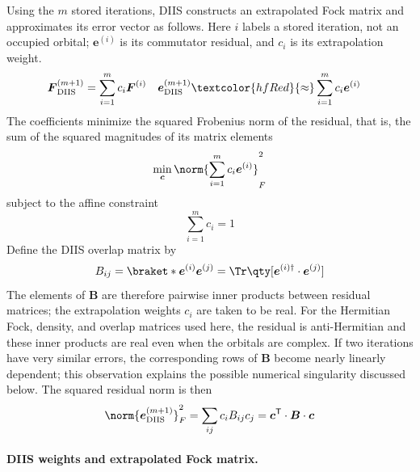 \documentclass[11pt,a4paper,titlepage]{article}
\numberwithin{equation}{section}
\newcommand{\bc}{\boldsymbol{c}}
\newcommand{\be}{\boldsymbol{e}}
\newcommand{\bB}{\boldsymbol{B}}
\newcommand{\bF}{\boldsymbol{F}}
\newcommand{\red}[1]{\textcolor{hfRed}{#1}}
\begin{document}
Using the $m$ stored iterations, DIIS constructs an extrapolated Fock matrix
and approximates its error vector as follows. Here $i$ labels a stored
iteration, not an occupied orbital; $\be^{(i)}$ is its commutator residual,
and $c_i$ is its extrapolation weight.
\begin{align}
  \bF_\text{DIIS}^{(m+1)}
  &=\sum_{i=1}^{m}c_i\bF^{(i)}
  &
  \be_\text{DIIS}^{(m+1)}
  &\red{\approx}\sum_{i=1}^{m}c_i\be^{(i)}
\end{align}
The coefficients minimize the squared Frobenius norm of the residual, that
is, the sum of the squared magnitudes of its matrix elements
\begin{equation}
    \min_{\bc}
    \norm{\sum_{i=1}^{m}c_i\be^{(i)}}_F^2
\end{equation}
subject to the affine constraint
\begin{equation}
    \sum_{i=1}^{m}c_i=1
\end{equation}
Define the DIIS overlap matrix by
\begin{equation}
  B_{ij}
  =\braket*{\be^{(i)}}{\be^{(j)}}
  =\Tr\qty[\be^{(i)\dagger}\cdot\be^{(j)}]
\end{equation}
The elements of $\bB$ are therefore pairwise inner products between residual
matrices; the extrapolation weights $c_i$ are taken to be real. For the
Hermitian Fock, density, and overlap matrices used here, the residual is
anti-Hermitian and these inner products are real even when the orbitals are
complex. If two iterations have very similar errors, the corresponding rows
of $\bB$ become nearly linearly dependent; this observation explains the
possible numerical singularity discussed below.
The squared residual norm is then
\begin{equation}
  \norm{\be_\text{DIIS}^{(m+1)}}_F^2
  =\sum_{ij}c_iB_{ij}c_j
  =\bc^\mathsf{T}\cdot\bB\cdot\bc
\end{equation}

\paragraph{DIIS weights and extrapolated Fock matrix.}
\end{document}
